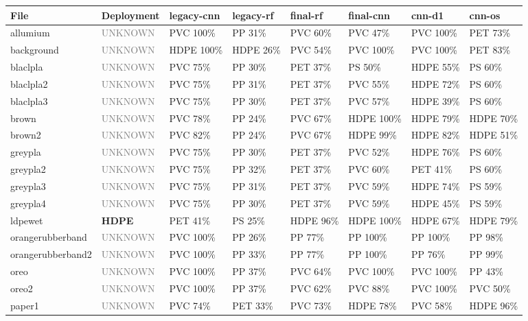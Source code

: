 \documentclass[11pt,a4paper]{article}
\newcommand{\unk}{\textcolor{gray}{UNKNOWN}}
\begin{document}
\begin{table}[p]
\centering
\scriptsize
\setlength{\tabcolsep}{4pt}
\begin{tabular}{llllllll}
\toprule
File & \textbf{Deployment} & legacy-cnn & legacy-rf & final-rf & final-cnn & cnn-d1 & cnn-os \\
\midrule
allumium          & \unk & PVC 100\% & PP 31\%  & PVC 60\% & PVC 47\%  & PVC 100\% & PET 73\% \\
background        & \unk & HDPE 100\%& HDPE 26\%& PVC 54\% & PVC 100\% & PVC 100\% & PET 83\% \\
blaclpla          & \unk & PVC 75\%  & PP 30\%  & PET 37\% & PS 50\%   & HDPE 55\% & PS 60\% \\
blaclpla2         & \unk & PVC 75\%  & PP 31\%  & PET 37\% & PVC 55\%  & HDPE 72\% & PS 60\% \\
blaclpla3         & \unk & PVC 75\%  & PP 30\%  & PET 37\% & PVC 57\%  & HDPE 39\% & PS 60\% \\
brown             & \unk & PVC 78\%  & PP 24\%  & PVC 67\% & HDPE 100\%& HDPE 79\% & HDPE 70\% \\
brown2            & \unk & PVC 82\%  & PP 24\%  & PVC 67\% & HDPE 99\% & HDPE 82\% & HDPE 51\% \\
greypla           & \unk & PVC 75\%  & PP 30\%  & PET 37\% & PVC 52\%  & HDPE 76\% & PS 60\% \\
greypla2          & \unk & PVC 75\%  & PP 32\%  & PET 37\% & PVC 60\%  & PET 41\%  & PS 60\% \\
greypla3          & \unk & PVC 75\%  & PP 31\%  & PET 37\% & PVC 59\%  & HDPE 74\% & PS 59\% \\
greypla4          & \unk & PVC 75\%  & PP 30\%  & PET 37\% & PVC 59\%  & HDPE 45\% & PS 59\% \\
ldpewet           & \textbf{HDPE} & PET 41\% & PS 25\% & HDPE 96\% & HDPE 100\% & HDPE 67\% & HDPE 79\% \\
orangerubberband  & \unk & PVC 100\% & PP 26\%  & PP 77\%  & PP 100\%  & PP 100\%  & PP 98\% \\
orangerubberband2 & \unk & PVC 100\% & PP 33\%  & PP 77\%  & PP 100\%  & PP 76\%   & PP 99\% \\
oreo              & \unk & PVC 100\% & PP 37\%  & PVC 64\% & PVC 100\% & PVC 100\% & PP 43\% \\
oreo2             & \unk & PVC 100\% & PP 37\%  & PVC 62\% & PVC 88\%  & PVC 100\% & PVC 50\% \\
paper1            & \unk & PVC 74\%  & PET 33\% & PVC 73\% & HDPE 78\% & PVC 58\%  & HDPE 96\% \\

\end{tabular}
\end{table}
\end{document}

